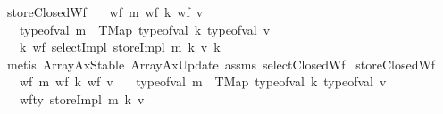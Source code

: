 \begin{isabellebody}
\endisatagproof
{\isafoldproof}%
%
\isadelimproof
\isanewline
%
\endisadelimproof
\isanewline
{}\isamarkupfalse%
\ storeClosedWf{}{\isacharcolon}{\kern0pt}\isanewline
\ \ \ {\isachardoublequoteopen}wf\ m{\isachardoublequoteclose}\ {\isachardoublequoteopen}wf\ k{\isachardoublequoteclose}\ {\isachardoublequoteopen}wf\ v{\isachardoublequoteclose}\isanewline
\ \ \ {\isachardoublequoteopen}type{\isacharunderscore}{\kern0pt}of{\isacharunderscore}{\kern0pt}val\ m\ {\isacharequal}{\kern0pt}\ TMap\ {\isacharparenleft}{\kern0pt}type{\isacharunderscore}{\kern0pt}of{\isacharunderscore}{\kern0pt}val\ k{\isacharparenright}{\kern0pt}\ {\isacharparenleft}{\kern0pt}type{\isacharunderscore}{\kern0pt}of{\isacharunderscore}{\kern0pt}val\ v{\isacharparenright}{\kern0pt}{\isachardoublequoteclose}\isanewline
\ \ \ {\isachardoublequoteopen}{\isacharparenleft}{\kern0pt}{\isasymforall}k{\isacharprime}{\kern0pt}{\isachardot}{\kern0pt}\ wf\ {\isacharparenleft}{\kern0pt}selectImpl\ {\isacharparenleft}{\kern0pt}storeImpl\ m\ k\ v{\isacharparenright}{\kern0pt}\ k{\isacharprime}{\kern0pt}{\isacharparenright}{\kern0pt}{\isacharparenright}{\kern0pt}{\isachardoublequoteclose}\isanewline
%
\isadelimproof
\ \ %
\endisadelimproof
%
\isatagproof
{}\isamarkupfalse%
\ {\isacharparenleft}{\kern0pt}metis\ ArrayAxStable\ ArrayAxUpdate\ assms{\isacharparenleft}{\kern0pt}{}{\isacharcomma}{\kern0pt}{}{\isacharcomma}{\kern0pt}{}{\isacharcomma}{\kern0pt}{}{\isacharparenright}{\kern0pt}\ selectClosedWf{\isacharparenright}{\kern0pt}%
\endisatagproof
{\isafoldproof}%
%
\isadelimproof
\isanewline
%
\endisadelimproof
\isanewline
{}\isamarkupfalse%
\ storeClosedWf{}{\isacharcolon}{\kern0pt}\isanewline
\ \ \ {\isachardoublequoteopen}wf\ m{\isachardoublequoteclose}\ {\isachardoublequoteopen}wf\ k{\isachardoublequoteclose}\ {\isachardoublequoteopen}wf\ v{\isachardoublequoteclose}\isanewline
\ \ \ {\isachardoublequoteopen}type{\isacharunderscore}{\kern0pt}of{\isacharunderscore}{\kern0pt}val\ m\ {\isacharequal}{\kern0pt}\ TMap\ {\isacharparenleft}{\kern0pt}type{\isacharunderscore}{\kern0pt}of{\isacharunderscore}{\kern0pt}val\ k{\isacharparenright}{\kern0pt}\ {\isacharparenleft}{\kern0pt}type{\isacharunderscore}{\kern0pt}of{\isacharunderscore}{\kern0pt}val\ v{\isacharparenright}{\kern0pt}{\isachardoublequoteclose}\isanewline
\ \ \ {\isachardoublequoteopen}wf{\isacharunderscore}{\kern0pt}ty\ {\isacharparenleft}{\kern0pt}storeImpl\ m\ k\ v{\isacharparenright}{\kern0pt}{\isachardoublequoteclose}\isanewline

\end{isabellebody}
